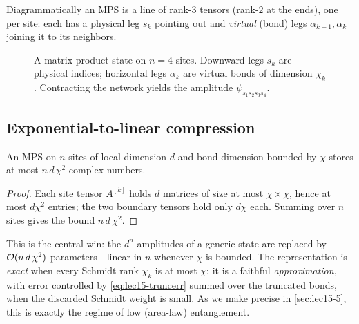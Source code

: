 Diagrammatically an MPS is a line of rank-$3$ tensors (rank-$2$ at the ends), one
per site: each has a physical leg $s_k$ pointing out and \emph{virtual} (bond)
legs $\alpha_{k-1},\alpha_k$ joining it to its neighbors.

\begin{figure}[t]
\centering
{}
\caption{A matrix product state on $n=4$ sites. Downward legs $s_k$ are physical
indices; horizontal legs $\alpha_k$ are virtual bonds of dimension $\chi_k$.
Contracting the network yields the amplitude $\psi_{s_1 s_2 s_3 s_4}$.}
\label{fig:lec15-mps}
\end{figure}

\subsection{Exponential-to-linear compression}

\begin{proposition}\label{prop:lec15-storage}
An MPS on $n$ sites of local dimension $d$ and bond dimension bounded by $\chi$
stores at most $n\,d\,\chi^{2}$ complex numbers.
\end{proposition}

\begin{proof}
Each site tensor $A^{[k]}$ holds $d$ matrices of size at most $\chi\times\chi$,
hence at most $d\chi^{2}$ entries; the two boundary tensors hold only $d\chi$
each. Summing over $n$ sites gives the bound $n\,d\,\chi^{2}$.
\end{proof}

This is the central win: the $d^{n}$ amplitudes of a generic state are replaced
by $\mathcal{O}(n\,d\,\chi^{2})$ parameters---linear in $n$ whenever $\chi$ is bounded.
The representation is \emph{exact} when every Schmidt rank $\chi_k$ is at most
$\chi$; it is a faithful \emph{approximation}, with error controlled by
\eqref{eq:lec15-truncerr} summed over the truncated bonds, when the discarded
Schmidt weight is small. As we make precise in \cref{sec:lec15-5}, this is
exactly the regime of low (area-law) entanglement.


